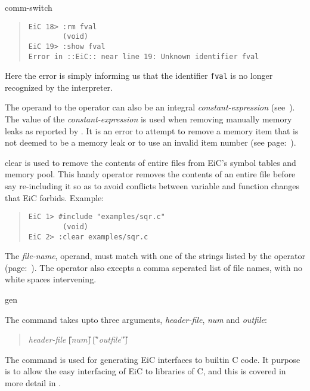 \begin{Ventry}{comm-switch }
\begin{quote}
\begin{verbatim}
EiC 18> :rm fval
        (void)
EiC 19> :show fval
Error in ::EiC:: near line 19: Unknown identifier fval
\end{verbatim}
\end{quote}
        Here the error is simply informing
        us that the identifier {\tt fval} is no 
        longer recognized by the interpreter.

        The operand to the  operator can also be an integral
        {\it constant-expression} (see~). The value
        of the {\it constant-expression} is used when removing
        manually memory leaks as reported by . It is an
        error to attempt to remove a memory item that is not deemed to
        be a memory leak or to use an invalid item number (see
         page:~\pageref{item:memdump}).


\item[clear] 
\label{item:clear}
        is used to remove the contents of entire files from EiC's
        symbol tables and memory pool. This handy operator removes the
        contents of an entire file before say re-including it so
        as to avoid conflicts between variable and function changes
        that EiC forbids. Example:

\begin{quote}
\begin{verbatim}
EiC 1> #include "examples/sqr.c"
        (void)
EiC 2> :clear examples/sqr.c
\end{verbatim}
\end{quote}
The {\it file-name}, operand, must match with one of the strings listed
by the  operator (page:~\pageref{item:files}). The  operator also
excepts a comma seperated list of file names, with no white spaces intervening.

\item[gen]
\label{item:gen}


The  command takes upto three arguments, \textit{header-file},
\textit{num} and \textit{outfile}:

\small
\begin{quote}
 \textit{header-file} \U{[}\textit{num}\U{]}  \U{["}\textit{outfile}\U{"}\U{]} 
\end{quote}
\normalsize


The  command is used for generating EiC interfaces to builtin
C code. It purpose is to allow the easy interfacing of EiC to libraries
of C, and this is covered in more detail in .


\end{Ventry}
